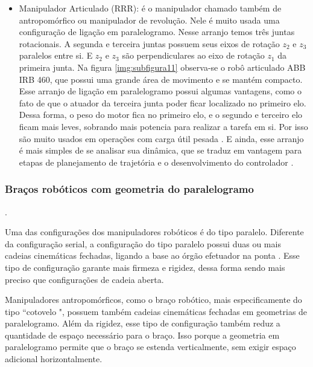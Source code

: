 \begin{itemize}
	\item Manipulador Articulado (RRR): é o manipulador chamado também de
	antropomórfico ou manipulador de revolução. Nele é muito usada uma configuração
	de ligação em paralelogramo. Nesse arranjo temos três juntas rotacionais. A segunda e
	terceira juntas possuem seus eixos de rotação $z_2$ e $z_3$ paralelos entre si. E $z_2$ e $z_3$ são
	perpendiculares ao eixo de rotação $z_1$ da primeira junta. Na figura \ref{img:subfigura11} observa-se o robô
	articulado ABB IRB 460, que possui uma grande área de movimento e se mantém
	compacto. Esse arranjo de ligação em paralelogramo possui algumas vantagens, como
	o fato de que o atuador da terceira junta poder ficar localizado no primeiro elo. Dessa
	forma, o peso do motor fica no primeiro elo, e o segundo e terceiro elo ficam mais
	leves, sobrando mais potencia para realizar a tarefa em si. Por isso são muito usados em operações com carga útil pesada \cite{Siciliano2009}. E ainda, esse arranjo é
	mais simples de se analisar sua dinâmica, que se traduz em vantagem para etapas de planejamento de trajetória e o desenvolvimento do controlador \cite{Spong2020}.
	
\end{itemize}

\subsubsection{Braços robóticos com geometria do paralelogramo}
.

Uma das configurações dos manipuladores robóticos é do tipo paralelo. Diferente da configuração serial, a configuração do tipo paralelo possui duas ou mais cadeias cinemáticas fechadas, ligando a base ao órgão efetuador na ponta \cite{Siciliano2009}. Esse tipo de configuração garante mais firmeza e rigidez, dessa forma sendo mais preciso que configurações de cadeia aberta.

Manipuladores antropomórficos, como o braço robótico, mais especificamente do tipo “cotovelo ", possuem também cadeias cinemáticas fechadas em geometrias de paralelogramo. Além da rigidez, esse tipo de configuração também reduz a quantidade de espaço necessário para o braço. Isso porque a geometria em paralelogramo permite que o braço se estenda verticalmente, sem exigir espaço adicional horizontalmente.

